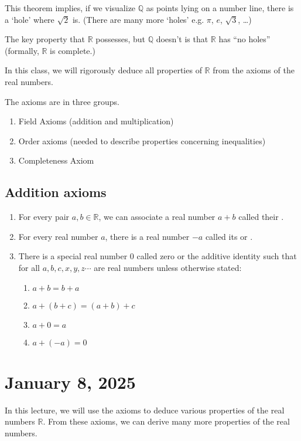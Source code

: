 \documentclass[11pt]{article}
\begin{document}
This theorem implies, if we visualize $\mathbb{Q}$ as points lying on a number
line, there is a `hole' where $\sqrt{2}$ is. (There are many more `holes' e.g.
$\pi$, $e$, $\sqrt{3}$, \ldots)

The key property that $\mathbb{R}$ possesses, but $\mathbb{Q}$ doesn't is that
$\mathbb{R}$ has ``no holes'' (formally, $\mathbb{R}$ is complete.)

In this class, we will rigorously deduce all properties of $\mathbb{R}$ from
the axioms of the real numbers.

The axioms are in three groups.

\begin{enumerate}
    \item Field Axioms (addition and multiplication)
    \item Order axioms (needed to describe properties concerning inequalities)
    \item Completeness Axiom
\end{enumerate}

\subsection{Addition axioms}
\begin{enumerate}
    \item For every pair $a, b \in \mathbb{R}$, we can associate a real number $a + b$
          called their .
    \item For every real number $a$, there is a real number $-a$ called its
           or .
    \item There is a special real number $0$ called zero or the additive identity such
          that for all $a, b, c, x, y, z \cdots $ are real numbers unless otherwise
          stated:
          \begin{enumerate}
              \item $a + b = b + a$
              \item $a + (b + c) = (a + b) + c$
              \item $a + 0 = a$
              \item $a + (-a) = 0$
          \end{enumerate}
\end{enumerate}

\section{January 8, 2025}
In this lecture, we will use the axioms to deduce various properties of the
real numbers $\mathbb{R}$. From these axioms, we can derive many more
properties of the real numbers.
\end{document}
